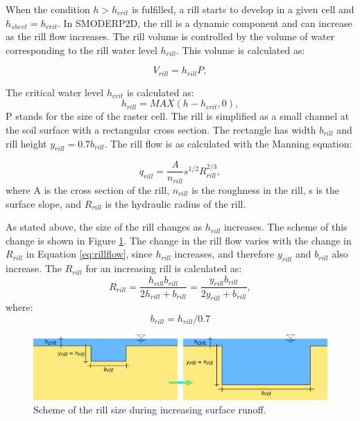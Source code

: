 When the condition $h>h_{crit}$ is fulfilled, a rill starts to develop in a
given cell and $h_{sheet}=h_{crit}$. In SMODERP2D, the rill is a dynamic component and
can increase as the rill flow increases. The rill volume is controlled by the
volume of water corresponding to the rill water level $h_{rill}$. This volume is
calculated as:


\begin{equation}
  V_{rill} = h_{rill}P,
  \label{eq:rillvol}
\end{equation}

The critical water level $h_{crit}$ is calculated as:
\begin{equation}
  h_{rill} = MAX(h-h_{crit},0),
  \label{eq:hrill}
\end{equation}
P stands for the size of the raster cell. The rill is simplified as a small
channel at the soil surface with a rectangular cross section. The rectangle has
width $b_{rill}$ and rill height $y_{rill} = 0.7b_{rill}$. The rill flow is as
calculated with the Manning equation: 

\begin{equation}
    q_{rill} = \frac{A}{n_{rill}} s^{1/2} R_{rill}^{2/3},
  \label{eq:rillflow}
\end{equation}
where A is the cross section of the rill,  $n_{rill}$ is the roughness in the
rill, s is the surface slope, and  $R_{rill}$  is the hydraulic radius of the
rill. 

As stated above, the size of the rill changes as $h_{rill}$ increases. The
scheme of this change is shown in Figure \ref{fig:rill_plneni}. The change in
the rill flow varies with the change in $R_{rill}$ in Equation
\ref{eq:rillflow}, since $h_{rill}$ increases, and therefore $y_{rill}$ and
$b_{rill}$ also increase. The $R_{rill}$ for an increasing rill is calculated
as:
\begin{equation}
    R_{rill} = \frac{h_{rill}b_{rill}}{2h_{rill}+b_{rill}}  =
    \frac{y_{rill}b_{rill}}{2y_{rill}+b_{rill}},
  \label{eq:rrill}
\end{equation}
where:
\begin{equation}
  b_{rill} = h_{rill}/0.7
  \label{eq:brill}
\end{equation}


\begin{figure}[b]
    \centering
    \includegraphics[width=1\linewidth]{./img/rill_schema_plneni.png}
    \caption{Scheme of the rill size during increasing surface runoff.}
    \label{fig:rill_plneni}
\end{figure}


